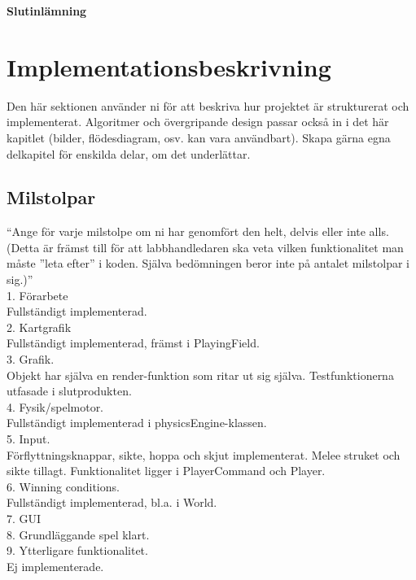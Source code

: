 \begin{center}
  \textbf{\Huge Slutinlämning}\\[1cm]
\end{center}
\section{Implementationsbeskrivning}
{\color{red}Den här sektionen använder ni för att beskriva hur projektet är strukturerat och implementerat. Algoritmer och övergripande design passar också in i det här kapitlet (bilder, flödesdiagram, osv. kan vara användbart). Skapa gärna egna delkapitel för enskilda delar, om det underlättar.\\ }
\subsection{Milstolpar}
{\color{red}``Ange för varje milstolpe om ni har genomfört den helt, delvis eller inte alls.  (Detta är främst till för att labbhandledaren ska veta vilken funktionalitet man måste ”leta efter” i koden.  Själva bedömningen beror inte på antalet milstolpar i sig.)''\\}
1. Förarbete\\
Fullständigt implementerad.\\
2. Kartgrafik\\
Fullständigt implementerad, främst i PlayingField.\\
3. Grafik.\\
Objekt har själva en render-funktion som ritar ut sig själva. Testfunktionerna utfasade i slutprodukten.\\
4. Fysik/spelmotor.\\
Fullständigt implementerad i physicsEngine-klassen.\\
5. Input.\\
Förflyttningsknappar, sikte, hoppa och skjut implementerat. Melee struket och sikte tillagt. Funktionalitet ligger i PlayerCommand och Player.\\
6. Winning conditions.\\
Fullständigt implementerad, bl.a. i World.\\
7. GUI\\
8. Grundläggande spel klart.\\
9. Ytterligare funktionalitet.\\
Ej implementerade.\\
